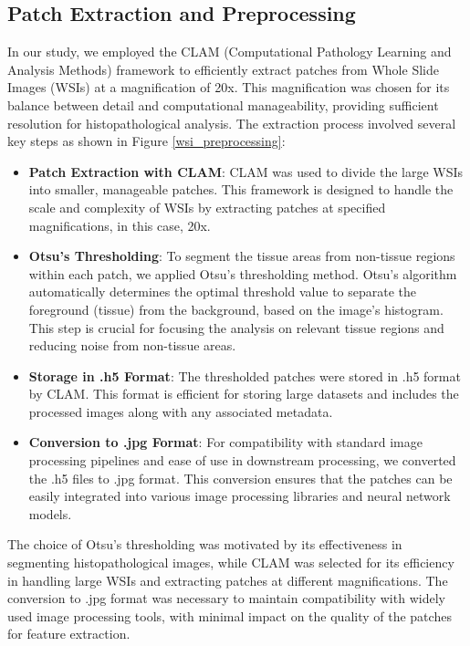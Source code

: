 \documentclass[10pt,twocolumn]{article}
\begin{document}
\subsection{Patch Extraction and Preprocessing}

In our study, we employed the CLAM (Computational Pathology Learning and Analysis Methods) framework to efficiently extract patches from Whole Slide Images (WSIs) at a magnification of 20x. This magnification was chosen for its balance between detail and computational manageability, providing sufficient resolution for histopathological analysis. The extraction process involved several key steps as shown in Figure \ref{wsi_preprocessing}:

\begin{itemize}
    \item \textbf{Patch Extraction with CLAM}: CLAM was used to divide the large WSIs into smaller, manageable patches. This framework is designed to handle the scale and complexity of WSIs by extracting patches at specified magnifications, in this case, 20x.

    \item \textbf{Otsu's Thresholding}: To segment the tissue areas from non-tissue regions within each patch, we applied Otsu's thresholding method. Otsu's algorithm automatically determines the optimal threshold value to separate the foreground (tissue) from the background, based on the image's histogram. This step is crucial for focusing the analysis on relevant tissue regions and reducing noise from non-tissue areas.
   

    \item \textbf{Storage in .h5 Format}: The thresholded patches were stored in .h5 format by CLAM. This format is efficient for storing large datasets and includes the processed images along with any associated metadata.

    \item \textbf{Conversion to .jpg Format}: For compatibility with standard image processing pipelines and ease of use in downstream processing, we converted the .h5 files to .jpg format. This conversion ensures that the patches can be easily integrated into various image processing libraries and neural network models.
\end{itemize}

The choice of Otsu's thresholding was motivated by its effectiveness in segmenting histopathological images, while CLAM was selected for its efficiency in handling large WSIs and extracting patches at different magnifications. The conversion to .jpg format was necessary to maintain compatibility with widely used image processing tools, with minimal impact on the quality of the patches for feature extraction.
\end{document}
